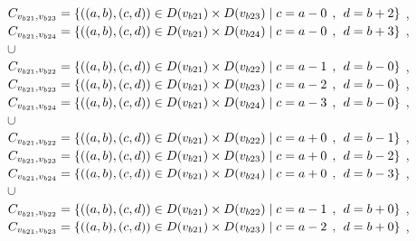 \\$C_{v_{b21},v_{b23}}=\{((a,b),(c,d))\in D(v_{b21}) \times D(v_{b23})\mid c = a - 0\hspace{1ex} , \hspace{1ex}  d = b + 2 \}$ , 
\\$C_{v_{b21},v_{b24}}=\{((a,b),(c,d))\in D(v_{b21}) \times D(v_{b24})\mid c = a - 0\hspace{1ex} , \hspace{1ex}  d = b + 3 \}$ , 
\\$\cup$
\\$C_{v_{b21},v_{b22}}=\{((a,b),(c,d))\in D(v_{b21}) \times D(v_{b22})\mid c = a - 1\hspace{1ex} , \hspace{1ex}  d = b - 0 \}$ , 
\\$C_{v_{b21},v_{b23}}=\{((a,b),(c,d))\in D(v_{b21}) \times D(v_{b23})\mid c = a - 2\hspace{1ex} , \hspace{1ex}  d = b - 0 \}$ , 
\\$C_{v_{b21},v_{b24}}=\{((a,b),(c,d))\in D(v_{b21}) \times D(v_{b24})\mid c = a - 3\hspace{1ex} , \hspace{1ex}  d = b - 0 \}$ , 
\\$\cup$
\\$C_{v_{b21},v_{b22}}=\{((a,b),(c,d))\in D(v_{b21}) \times D(v_{b22})\mid c = a + 0\hspace{1ex} , \hspace{1ex}  d = b - 1 \}$ , 
\\$C_{v_{b21},v_{b23}}=\{((a,b),(c,d))\in D(v_{b21}) \times D(v_{b23})\mid c = a + 0\hspace{1ex} , \hspace{1ex}  d = b - 2 \}$ , 
\\$C_{v_{b21},v_{b24}}=\{((a,b),(c,d))\in D(v_{b21}) \times D(v_{b24})\mid c = a + 0\hspace{1ex} , \hspace{1ex}  d = b - 3 \}$ , 
\\$\cup$
\\$C_{v_{b21},v_{b22}}=\{((a,b),(c,d))\in D(v_{b21}) \times D(v_{b22})\mid c = a - 1\hspace{1ex} , \hspace{1ex}  d = b + 0 \}$ , 
\\$C_{v_{b21},v_{b23}}=\{((a,b),(c,d))\in D(v_{b21}) \times D(v_{b23})\mid c = a - 2\hspace{1ex} , \hspace{1ex}  d = b + 0 \}$ , 
